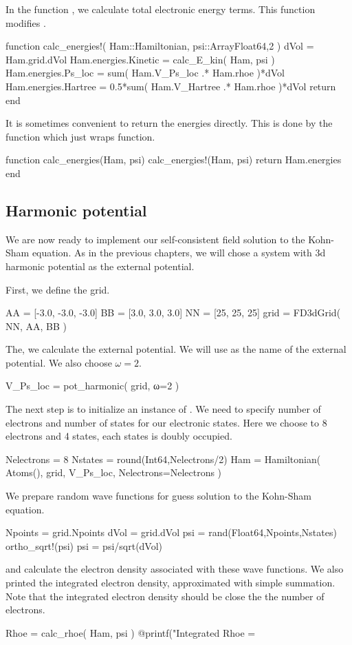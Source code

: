 In the function , we calculate total electronic energy terms.
This function modifies .
\begin{juliacode}
function calc_energies!( Ham::Hamiltonian, psi::Array{Float64,2} )
  dVol = Ham.grid.dVol
  Ham.energies.Kinetic = calc_E_kin( Ham, psi )
  Ham.energies.Ps_loc = sum( Ham.V_Ps_loc .* Ham.rhoe )*dVol
  Ham.energies.Hartree = 0.5*sum( Ham.V_Hartree .* Ham.rhoe )*dVol
  return
end
\end{juliacode}
It is sometimes convenient to return the energies directly. This is done by
the function  which just wraps 
function.
\begin{juliacode}
function calc_energies(Ham, psi)
  calc_energies!(Ham, psi)
  return Ham.energies
end
\end{juliacode}


\subsection{Harmonic potential}

We are now ready to implement our self-consistent field solution to the Kohn-Sham equation.
As in the previous chapters, we will chose a system with 3d harmonic potential as the
external potential.

First, we define the grid.
\begin{juliacode}
AA = [-3.0, -3.0, -3.0]
BB = [3.0, 3.0, 3.0]
NN = [25, 25, 25]
grid = FD3dGrid( NN, AA, BB )
\end{juliacode}

The, we calculate the external potential. We will use  as the name of
the external potential. We also choose $\omega=2$.
\begin{juliacode}
V_Ps_loc = pot_harmonic( grid, ω=2 )
\end{juliacode}

The next step is to initialize an instance of . We need to specify
number of electrons and number of states for our electronic states. Here we choose to 8
electrons and 4 states, each states is doubly occupied.
\begin{juliacode}
Nelectrons = 8
Nstates = round(Int64,Nelectrons/2)
Ham = Hamiltonian( Atoms(), grid, V_Ps_loc, Nelectrons=Nelectrons )
\end{juliacode}

We prepare random wave functions for guess solution to the Kohn-Sham equation.
\begin{juliacode}
Npoints = grid.Npoints
dVol = grid.dVol
psi = rand(Float64,Npoints,Nstates)
ortho_sqrt!(psi)
psi = psi/sqrt(dVol)
\end{juliacode}
and calculate the electron density associated with these wave functions.
We also printed the integrated electron density, approximated with simple summation.
Note that the integrated electron density should be close the the number of electrons.
\begin{juliacode}
Rhoe = calc_rhoe( Ham, psi )
@printf("Integrated Rhoe = %
\end{juliacode}

